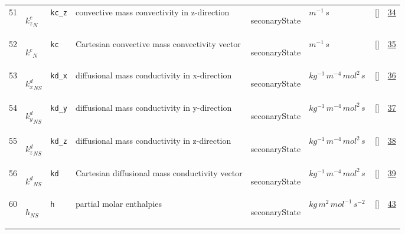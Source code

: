 \begin{longtable}{|p{1cm}|p{3cm}|p{3cm}|p{7cm}|p{3.0cm}|p{3cm}|p{2cm}|p{1cm}|}
    51
             & \hypertarget{"v:51"}{ $ {k^{c}_{z}}_{N} $}
             & \verb|kc_z|
             & convective mass convectivity in z-direction
             & \begin{lay}seconaryState \end{lay}
             & $ m^{-1} \,s \, $
             & []
             & \hyperlink{"e:34"}{ 34 }
                 \\
    52
             & \hypertarget{"v:52"}{ $ {k^{c}}_{N} $}
             & \verb|kc|
             & Cartesian convective mass convectivity vector
             & \begin{lay}seconaryState \end{lay}
             & $ m^{-1} \,s \, $
             & []
             & \hyperlink{"e:35"}{ 35 }
                 \\
    53
             & \hypertarget{"v:53"}{ $ {k^{d}_{x}}_{{N S}} $}
             & \verb|kd_x|
             & diffusional mass conductivity in x-direction
             & \begin{lay}seconaryState \end{lay}
             & $ kg^{-1} \,m^{-4} \,mol^{2} \,s \, $
             & []
             & \hyperlink{"e:36"}{ 36 }
                 \\
    54
             & \hypertarget{"v:54"}{ $ {k^{d}_{y}}_{{N S}} $}
             & \verb|kd_y|
             & diffusional mass conductivity in y-direction
             & \begin{lay}seconaryState \end{lay}
             & $ kg^{-1} \,m^{-4} \,mol^{2} \,s \, $
             & []
             & \hyperlink{"e:37"}{ 37 }
                 \\
    55
             & \hypertarget{"v:55"}{ $ {k^{d}_{z}}_{{N S}} $}
             & \verb|kd_z|
             & diffusional mass conductivity in z-direction
             & \begin{lay}seconaryState \end{lay}
             & $ kg^{-1} \,m^{-4} \,mol^{2} \,s \, $
             & []
             & \hyperlink{"e:38"}{ 38 }
                 \\
    56
             & \hypertarget{"v:56"}{ $ {k^{d}}_{{N S}} $}
             & \verb|kd|
             & Cartesian diffusional mass conductivity vector
             & \begin{lay}seconaryState \end{lay}
             & $ kg^{-1} \,m^{-4} \,mol^{2} \,s \, $
             & []
             & \hyperlink{"e:39"}{ 39 }
                 \\
    60
             & \hypertarget{"v:60"}{ $ {h}_{{N S}} $}
             & \verb|h|
             & partial molar enthalpies
             & \begin{lay}seconaryState \end{lay}
             & $ kg \,m^{2} \,mol^{-1} \,s^{-2} \, $
             & []
             & \hyperlink{"e:43"}{ 43 }
                 \\
    \end{longtable}